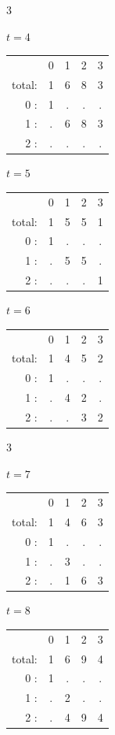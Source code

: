\documentclass[reqno]{amsart}
\theoremstyle{plain} %
\theoremstyle{definition}
\theoremstyle{remark}
\begin{document}
\begin{figure}[H]
\begin{center}
\begin{multicols}{3} 

$t=4$

\begin{tabular}{r c c c c}
 & 0 & 1 & 2 & 3 \\
total: & 1 & 6 & 8 & 3\\
0 : & 1 & . & . & . \\
1 : & . & 6 & 8 & 3 \\
2 : & . & . & . & . 
\end{tabular}

\columnbreak

$t=5$

\begin{tabular}{r c c c c}
 & 0 & 1 & 2 & 3 \\
total: & 1 & 5 & 5 & 1 \\
0 : & 1 & . & . & . \\
1 : & . & 5 & 5 & . \\
2 : & . & . & . & 1 
\end{tabular}

\columnbreak

$t=6$

\begin{tabular}{r c c c c}
 & 0 & 1 & 2 & 3 \\
total: & 1 & 4 & 5 & 2 \\
0 : & 1 & . & . & . \\
1 : & . & 4 & 2 & . \\
2 : & . & . & 3 & 2 
\end{tabular}
\end{multicols}


\begin{multicols}{3}

$t=7$

\begin{tabular}{r c c c c}
 & 0 & 1 & 2 & 3 \\
total: & 1 & 4 & 6 & 3 \\
0 : & 1 & . & . & . \\
1 : & . & 3 & . & . \\
2 : & . & 1 & 6 & 3 
\end{tabular}

\columnbreak

$t=8$

\begin{tabular}{r c c c c}
 & 0 & 1 & 2 & 3 \\
total: & 1 & 6 & 9 & 4 \\
0 : & 1 & . & . & . \\
1 : & . & 2 & . & . \\
2 : & . & 4 & 9 & 4 
\end{tabular}


\end{multicols}
\end{center}
\end{figure}
\end{document}
